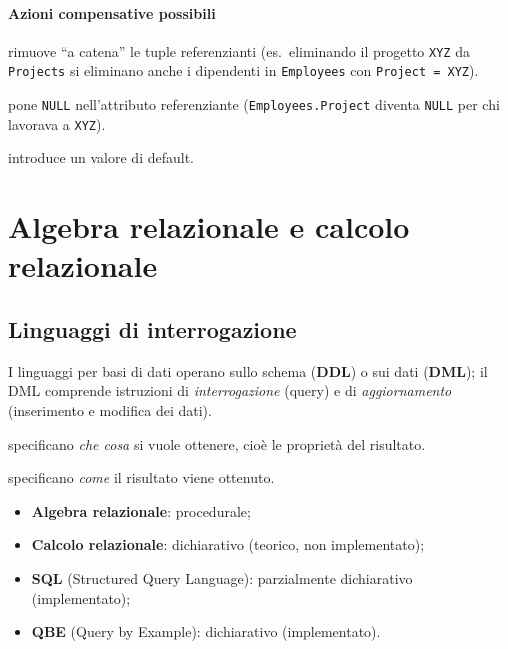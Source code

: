\documentclass[a4paper,12pt]{article}
\begin{document}
\paragraph{Azioni compensative possibili}
\begin{description}[style=nextline]
  \item[Cascade] rimuove ``a catena'' le tuple referenzianti (es.\ eliminando
    il progetto \texttt{XYZ} da \texttt{Projects} si eliminano anche i
    dipendenti in \texttt{Employees} con \texttt{Project = XYZ}).
  \item[Set NULL] pone \texttt{NULL} nell'attributo referenziante
    (\texttt{Employees.Project} diventa \texttt{NULL} per chi lavorava a
    \texttt{XYZ}).
  \item[Set default] introduce un valore di default.
\end{description}
\section{Algebra relazionale e calcolo relazionale}

\subsection{Linguaggi di interrogazione}

I linguaggi per basi di dati operano sullo schema (\textbf{DDL}) o sui dati
(\textbf{DML}); il DML comprende istruzioni di \emph{interrogazione} (query) e
di \emph{aggiornamento} (inserimento e modifica dei dati).

\begin{description}[style=nextline]
  \item[Dichiarativi] specificano \emph{che cosa} si vuole ottenere, cioè le
    proprietà del risultato.
  \item[Procedurali] specificano \emph{come} il risultato viene ottenuto.
\end{description}

\begin{itemize}
  \item \textbf{Algebra relazionale}: procedurale;
  \item \textbf{Calcolo relazionale}: dichiarativo (teorico, non implementato);
  \item \textbf{SQL} (Structured Query Language): parzialmente dichiarativo
    (implementato);
  \item \textbf{QBE} (Query by Example): dichiarativo (implementato).
\end{itemize}
\end{document}
